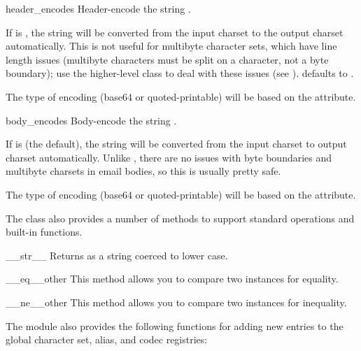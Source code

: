 \begin{methoddesc}{header_encode}{s}
Header-encode the string .

If  is , the string will be converted from the
input charset to the output charset automatically.  This is not useful
for multibyte character sets, which have line length issues (multibyte
characters must be split on a character, not a byte boundary); use the
higher-level  class to deal with these issues (see
).   defaults to .

The type of encoding (base64 or quoted-printable) will be based on
the  attribute.
\end{methoddesc}

\begin{methoddesc}{body_encode}{s}
Body-encode the string .

If  is  (the default), the string will be
converted from the input charset to output charset automatically.
Unlike , there are no issues with byte
boundaries and multibyte charsets in email bodies, so this is usually
pretty safe.

The type of encoding (base64 or quoted-printable) will be based on
the  attribute.
\end{methoddesc}

The  class also provides a number of methods to support
standard operations and built-in functions.

\begin{methoddesc}[Charset]{__str__}{}
Returns  as a string coerced to lower case.
\end{methoddesc}

\begin{methoddesc}[Charset]{__eq__}{other}
This method allows you to compare two  instances for equality.
\end{methoddesc}

\begin{methoddesc}[Header]{__ne__}{other}
This method allows you to compare two  instances for inequality.
\end{methoddesc}

The  module also provides the following
functions for adding new entries to the global character set, alias,
and codec registries:

